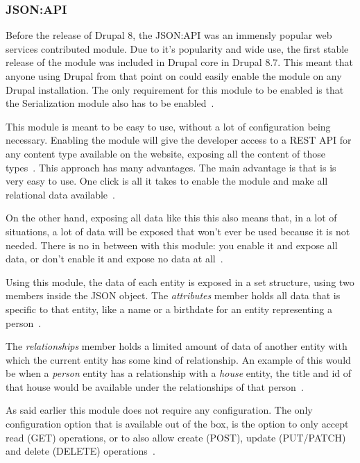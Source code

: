 \subsubsection{JSON:API}
\label{sss:JSONAPI}

Before the release of Drupal 8, the JSON:API was an immensly popular web services contributed module. Due to it's popularity and wide use, the first stable release of the module was included in Drupal core in Drupal 8.7. This meant that anyone using Drupal from that point on could easily enable the module on any Drupal installation. The only requirement for this module to be enabled is that the Serialization module also has to be enabled~\autocite{Drupal2019}.

This module is meant to be easy to use, without a lot of configuration being necessary. Enabling the module will give the developer access to a REST API for any content type available on the website, exposing all the content of those types~\autocite{So2018}. This approach has many advantages. The main advantage is that is is very easy to use. One click is all it takes to enable the module and make all relational data available~\autocite{So2018}.

On the other hand, exposing all data like this this also means that, in a lot of situations, a lot of data will be exposed that won't ever be used because it is not needed. There is no in between with this module: you enable it and expose all data, or don't enable it and expose no data at all~\autocite{So2018}.

Using this module, the data of each entity is exposed in a set structure, using two members inside the JSON object. The \emph{attributes} member holds all data that is specific to that entity, like a name or a birthdate for an entity representing a person~\autocite{Drupal2019}. 

The \emph{relationships} member holds a limited amount of data of another entity with which the current entity has some kind of relationship. An example of this would be when a \emph{person} entity has a relationship with a \emph{house} entity, the title and id of that house would be available under the relationships of that person~\autocite{Drupal2019}.

As said earlier this module does not require any configuration. The only configuration option that is available out of the box, is the option to only accept read (GET) operations, or to also allow create (POST), update (PUT/PATCH) and delete (DELETE) operations~\autocite{So2018}.


